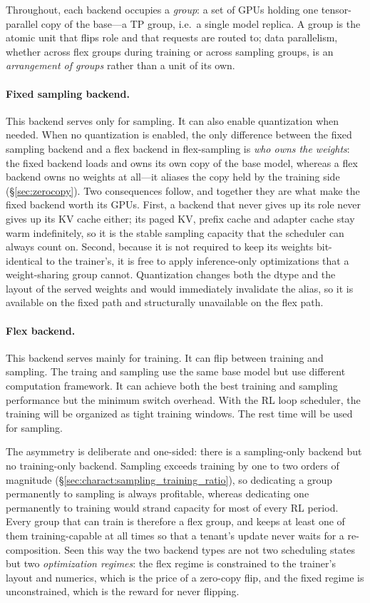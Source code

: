 Throughout, each backend occupies a \emph{group}: a set of GPUs holding one
tensor-parallel copy of the base---a TP group, i.e.\ a single model replica. A group is
the atomic unit that flips role and that requests are routed to; data parallelism, whether
across flex groups during training or across sampling groups, is an \emph{arrangement of
groups} rather than a unit of its own.

\paragraph{Fixed sampling backend.} This backend serves only for sampling. It can
also enable quantization when needed. When no quantization is enabled, the only
difference between the fixed sampling backend and a flex backend in flex-sampling is
\emph{who owns the weights}: the fixed backend loads and owns its own copy of the base
model, whereas a flex backend owns no weights at all---it aliases the copy held by the
training side (\S\ref{sec:zerocopy}). Two consequences follow, and together they are
what make the fixed backend worth its GPUs. First, a backend that never gives up its
role never gives up its KV cache either; its paged KV, prefix cache and adapter cache
stay warm indefinitely, so it is the stable sampling capacity that the scheduler can
always count on. Second, because it is not required to keep its weights bit-identical
to the trainer's, it is free to apply inference-only optimizations that a
weight-sharing group cannot. Quantization changes both the dtype and the layout of the
served weights and would immediately invalidate the alias, so it is available on the
fixed path and structurally unavailable on the flex path.

\paragraph{Flex backend.} This backend serves mainly for training. It can flip between training and sampling. The traing and sampling use the same base model but use different computation framework. It can achieve both the best training and sampling performance but the minimum switch overhead. With the RL loop scheduler, the training will be organized as tight training windows. The rest time will be used for sampling.

The asymmetry is deliberate and one-sided: there is a sampling-only backend but no
training-only backend. Sampling exceeds training by one to two orders of magnitude
(\S\ref{sec:charact:sampling_training_ratio}), so dedicating a group permanently to
sampling is always profitable, whereas dedicating one permanently to training would
strand capacity for most of every RL period. Every group that can train is therefore a
flex group, and \sysname keeps at least one of them training-capable at all times so
that a tenant's \textsf{update} never waits for a re-composition. Seen this way the two
backend types are not two scheduling states but two \emph{optimization regimes}: the
flex regime is constrained to the trainer's layout and numerics, which is the price of
a zero-copy flip, and the fixed regime is unconstrained, which is the reward for never
flipping.

